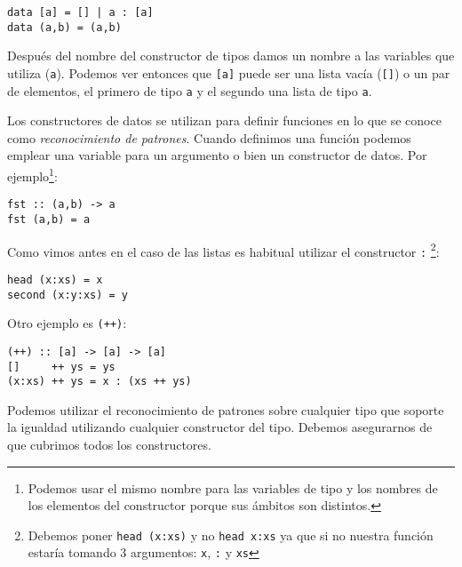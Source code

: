 \begin{lstlisting}
data [a] = [] | a : [a]
data (a,b) = (a,b)
\end{lstlisting}

Después del nombre del constructor de tipos damos un nombre a las variables que
utiliza (\texttt{a}). Podemos ver entonces que  \texttt{[a]} puede
ser una lista vacía (\texttt{[]}) o un par de elementos, el primero de tipo
\texttt{a} y el segundo una lista de tipo \texttt{a}.

Los constructores de datos se utilizan para definir funciones en lo que se conoce
como \textit{reconocimiento de patrones}. Cuando definimos una función podemos
emplear una variable para un argumento o bien un constructor de datos.
Por ejemplo\footnote{Podemos usar el mismo nombre para las variables de tipo y
los nombres de los elementos del constructor porque sus ámbitos son distintos.}:

\begin{lstlisting}
fst :: (a,b) -> a
fst (a,b) = a
\end{lstlisting}

Como vimos antes en el caso de las listas es habitual utilizar el constructor
\texttt{:}
\footnote{Debemos poner \texttt{head (x:xs)} y no \texttt{head x:xs} ya que si
no nuestra función estaría tomando 3 argumentos: \texttt{x}, \texttt{:} y \texttt{xs}
}:

\begin{lstlisting}
head (x:xs) = x
second (x:y:xs) = y
\end{lstlisting}

Otro ejemplo es \texttt{(++)}:
\begin{lstlisting}
(++) :: [a] -> [a] -> [a]
[]     ++ ys = ys
(x:xs) ++ ys = x : (xs ++ ys)
\end{lstlisting}

Podemos utilizar el reconocimiento de patrones sobre cualquier tipo que soporte
la igualdad utilizando cualquier constructor del tipo. Debemos asegurarnos de que
cubrimos todos los constructores.
